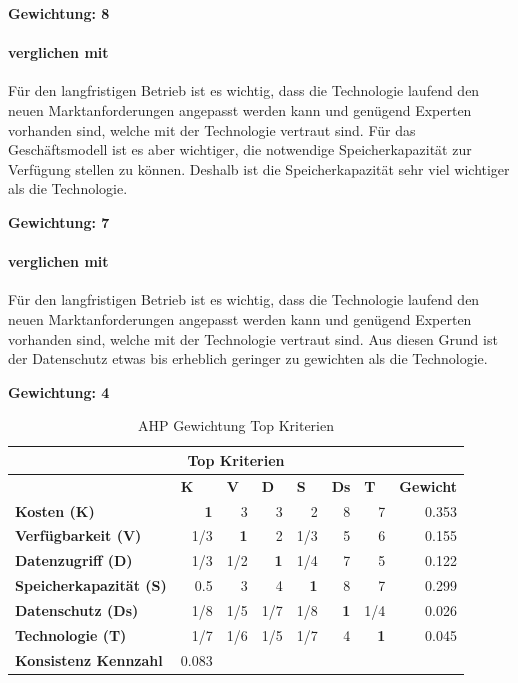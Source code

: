 \textbf{Gewichtung: 8}

\paragraph*{ verglichen mit }
Für den langfristigen Betrieb ist es wichtig, dass die Technologie laufend den neuen Marktanforderungen angepasst werden kann und genügend Experten vorhanden sind, welche mit der Technologie vertraut sind. Für das Geschäftsmodell ist es aber wichtiger, die notwendige Speicherkapazität zur Verfügung stellen zu können. Deshalb ist die Speicherkapazität sehr viel wichtiger als die Technologie.

\textbf{Gewichtung: 7}

\paragraph*{ verglichen mit }
Für den langfristigen Betrieb ist es wichtig, dass die Technologie laufend den neuen Marktanforderungen angepasst werden kann und genügend Experten vorhanden sind, welche mit der Technologie vertraut sind. Aus diesen Grund ist der Datenschutz etwas bis erheblich geringer zu gewichten als die Technologie.

\textbf{Gewichtung: 4}

\begin{table}[htbp]
\caption{AHP Gewichtung Top Kriterien}
\begin{tabular}{|l|r|r|r|r|r|r|r|}
\hline
\multicolumn{ 8}{|c|}{\textbf{Top Kriterien}} \\ \hline
 & \multicolumn{1}{l|}{\textbf{K}} & \multicolumn{1}{l|}{\textbf{V}} & \multicolumn{1}{l|}{\textbf{D}} & \multicolumn{1}{l|}{\textbf{S}} & \multicolumn{1}{l|}{\textbf{Ds}} & \multicolumn{1}{l|}{\textbf{T}} & \multicolumn{1}{l|}{\textbf{Gewicht}} \\ \hline
\textbf{Kosten (K)} & \textbf{1} & 3 & 3 & 2 & 8 & 7 & 0.353 \\ \hline
\textbf{Verfügbarkeit (V)} &  1/3 & \textbf{1} & 2 &  1/3 & 5 & 6 & 0.155 \\ \hline
\textbf{Datenzugriff (D)} &  1/3 &  1/2 & \textbf{1} &  1/4 & 7 & 5 & 0.122 \\ \hline
\textbf{Speicherkapazität (S)} & 0.5 & 3 & 4 & \textbf{1} & 8 & 7 & 0.299 \\ \hline
\textbf{Datenschutz (Ds)} &  1/8 &  1/5 &  1/7 &  1/8 & \textbf{1} &  1/4 & 0.026 \\ \hline
\textbf{Technologie (T)} &  1/7 &  1/6 &  1/5 &  1/7 & 4 & \textbf{1} & 0.045 \\ \hline
\textbf{Konsistenz Kennzahl} & 0.083  \\ \cline{1-2}
\end{tabular}
\label{AHPTop}
\end{table}

